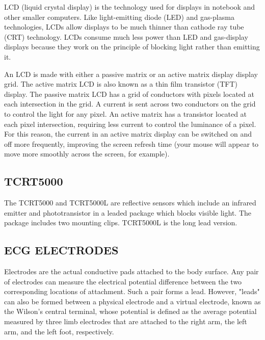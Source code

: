 \documentclass[12pt,a4paper]{report}
\begin{document}
\hspace*{1cm}LCD (liquid crystal display) is the technology used for displays in notebook and other smaller computers. Like light-emitting diode (LED) and gas-plasma technologies, LCDs allow displays to be much thinner than cathode ray tube (CRT) technology. LCDs consume much less power than LED and gas-display displays because they work on the principle of blocking light rather than emitting it.


An LCD is made with either a passive matrix or an active matrix display display grid. The active matrix LCD is also known as a thin film transistor (TFT) display. The passive matrix LCD has a grid of conductors with pixels located at each intersection in the grid. A current is sent across two conductors on the grid to control the light for any pixel. An active matrix has a transistor located at each pixel intersection, requiring less current to control the luminance of a pixel. For this reason, the current in an active matrix display can be switched on and off more frequently, improving the screen refresh time (your mouse will appear to move more smoothly across the screen, for example).
 
 
\subsection{TCRT5000}


\hspace*{1cm} The TCRT5000 and TCRT5000L are reflective sensors which include an infrared emitter and phototransistor in a leaded package which blocks visible light. The package includes two mounting clips. TCRT5000L is the long lead version.

 









\newpage
\subsection{ ECG ELECTRODES}



\hspace*{1cm} Electrodes are the actual conductive pads attached to the body surface. Any pair of electrodes can measure the electrical potential difference between the two corresponding locations of attachment. Such a pair forms a lead. However, "leads" can also be formed between a physical electrode and a virtual electrode, known as the Wilson's central terminal, whose potential is defined as the average potential measured by three limb electrodes that are attached to the right arm, the left arm, and the left foot, respectively.
\end{document}

